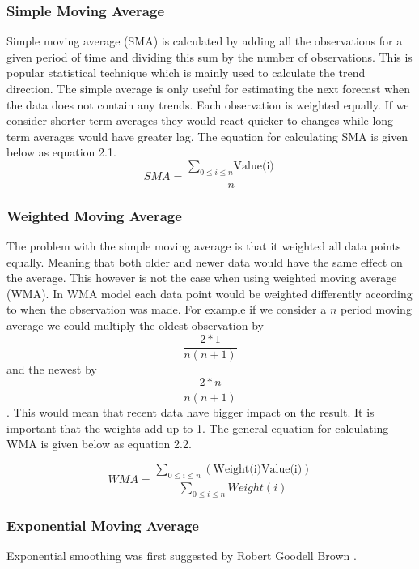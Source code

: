 \subsubsection{Simple Moving Average}
Simple moving average (SMA) is calculated by adding all the observations for a given period of time and dividing this sum by the number of observations. This is popular statistical technique which is mainly used to calculate the trend direction. The simple average is only useful for estimating the next forecast when the data does not contain any trends. Each observation is weighted equally. If we consider shorter term averages they would react quicker to changes while long term averages would have greater lag. The equation for calculating SMA is given below as equation 2.1.\\

\begin{equation}\label{sma}
	SMA = \frac{\sum_{0\le i\le n}\textrm{Value(i)}}{n}
\end{equation}

\subsubsection{Weighted Moving Average}
The problem with the simple moving average is that it weighted all data points equally. Meaning that both older and newer data would have the same effect on the average. This however is not the case when using weighted moving average (WMA). In WMA model each data point would be weighted differently according to when the observation was made. For example if we consider a $n$ period moving average we could multiply the oldest observation by \[\frac{2*1}{n(n+1)}\] and the newest by \[\frac{2*n}{n(n+1)}\]. This would mean that recent data have bigger impact on the result. It is important that the weights add up to 1. The general equation for calculating WMA is given below as equation 2.2.

\begin{equation}\label{wma}
WMA = \frac{\sum_{0\le i\le n}(\textrm{Weight(i)}\textrm{Value(i)})}{\sum_{0\le i\le n}Weight(i)}
\end{equation}

\subsubsection{Exponential Moving Average}
Exponential smoothing was first suggested by Robert Goodell Brown \cite{FOR3980040103}. 

